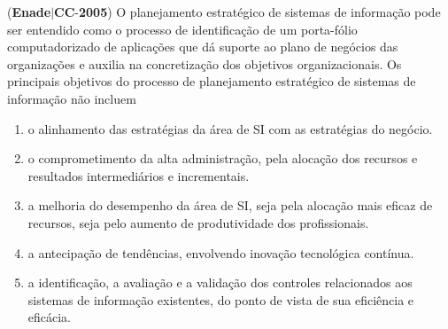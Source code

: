 \documentclass{exam}
\begin{document}
\begin{questions}
\begin{enumerate}[label=\alph*)]
	\end{enumerate}

\question (\textbf{Enade}$|$\textbf{CC}-\textbf{2005}) O planejamento estratégico de sistemas de informação pode ser
entendido como o processo de identificação de um porta-fólio
computadorizado de aplicações que dá suporte ao plano de
negócios das organizações e auxilia na concretização dos objetivos
organizacionais. Os principais objetivos do processo de
planejamento estratégico de sistemas de informação não incluem
	\begin{enumerate}[label=\alph*)]
		\item  o alinhamento das estratégias da área de SI com as estratégias
do negócio.
		\item  o comprometimento da alta administração, pela alocação dos
recursos e resultados intermediários e incrementais.
		\item  a melhoria do desempenho da área de SI, seja pela alocação
mais eficaz de recursos, seja pelo aumento de produtividade
dos profissionais.
		\item  a antecipação de tendências, envolvendo inovação tecnológica
contínua.
		\item  a identificação, a avaliação e a validação dos controles
relacionados aos sistemas de informação existentes, do ponto
de vista de sua eficiência e eficácia.

	\end{enumerate}


\end{questions}
\end{document}
